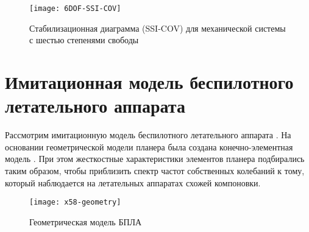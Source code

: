 
\begin{figure}[H]
	\centerfloat
	\texttt{[image: 6DOF-SSI-COV]}
	\caption{Стабилизационная диаграмма (SSI-COV) для механической системы с шестью степенями свободы} \label{6DOF-SSI-COV}
\end{figure}

\section{Имитационная модель беспилотного летательного аппарата}

Рассмотрим имитационную модель беспилотного летательного аппарата   \cite{XQ58-info}. На основании геометрической модели планера была создана конечно-элементная модель  . При этом жесткостные характеристики элементов планера подбирались таким образом, чтобы приблизить спектр частот собственных колебаний к тому, который наблюдается на летательных аппаратах схожей компоновки.

\begin{figure}[!htb]
	\centerfloat
	\texttt{[image: x58-geometry]}
	\caption{Геометрическая модель БПЛА} \label{x58-geometry}
\end{figure}

